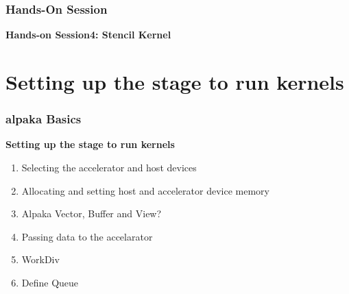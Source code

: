 \documentclass[9pt]{beamer}
\begin{document}




\begin{frame}
\frametitle{Hands-On Session}
\begin{center}
      \Huge \textbf{Hands-on Session4: Stencil Kernel}
  \end{center}
\end{frame}

\section{Setting up the stage to run kernels}

\begin{frame}
\frametitle{alpaka Basics }
\begin{center}
      \Huge \textbf{Setting up the stage to run kernels}
  \end{center}
\begin{enumerate}
 \item Selecting the accelerator and host devices
 \item Allocating and setting host and accelerator device memory
 \item Alpaka Vector, Buffer and View?
 \item Passing data to the accelarator
 \item WorkDiv
 \item Define Queue
\end{enumerate}
    \end{frame}
\end{document}
